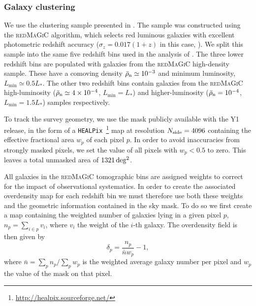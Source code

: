 \documentclass[a4paper,11pt]{article}
\newcommand{\mean}[1]{\bar{#1}}
\newcommand{\healpix}{\texttt{HEALPix}\xspace}
\newcommand{\redmagic}{\textsc{redMaGiC}\xspace}
\begin{document}
      \subsubsection{Galaxy clustering}\label{sssec:data.DES.gc}
        We use the clustering sample presented in \cite{1708.01536}. The sample was constructed using the \redmagic algorithm, which selects red luminous galaxies with excellent photometric redshift accuracy ($\sigma_z = 0.017(1+z)$ in this case, \cite{1507.05460}). We split this sample into the same five redshift bins used in the analysis of \cite{1708.01536,1708.01536, 1708.01530}. The three lower redshift bins are populated with galaxies from the \redmagic high-density sample. These have a comoving density $\mean{\rho}_{\rm{n}} \simeq 10^{-3}$ and minimum luminosity, $L_{\text{min}} \simeq 0.5 L_*$. The other two redshift bins contain galaxies from the \redmagic high-luminosity ($\mean{\rho}_{\rm{n}} \simeq 4\times 10^{-4}$, $L_{\text{min}} = L_*$) and higher-luminosity ($\mean{\rho}_{\rm{n}} = 10^{-4}$, $L_{\text{min}} = 1.5 L_*$) samples respectively. 

        To track the survey geometry, we use the mask publicly available with the Y1 release, in the form of a \healpix~\footnote{\url{http://healpix.sourceforge.net/}} \cite{astro-ph/0409513} map at resolution $N_{\rm side}=4096$ containing the effective fractional area $w_p$ of each pixel $p$. In order to avoid inaccuracies from strongly masked pixels, we set the value of all pixels with $w_p<0.5$ to zero. This leaves a total unmasked area of $\unit[1321]{deg^2}$.

        All galaxies in the \redmagic tomographic bins are assigned weights to correct for the impact of observational systematics. In order to create the associated overdensity map for each redshift bin we must therefore use both these weights and the geometric information contained in the sky mask. To do so we first create a map containing the weighted number of galaxies lying in a given pixel $p$, $n_p = \sum_{i\in p} v_i$, where $v_i$ the weight of the $i$-th galaxy. The overdensity field is then given by
        \begin{equation}\label{eq:des.gc.signal}
          \delta_{p} = \frac{n_p}{\mean{n} w_p} - 1,
        \end{equation}
        where  $\mean{n} = \sum_p n_p / \sum_p w_p$ is the weighted average galaxy number per pixel and $w_p$ the value of the mask on that pixel.
\end{document}

